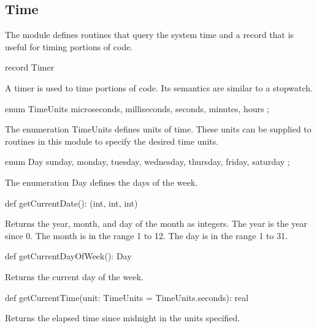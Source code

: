\subsection{Time}
\label{Time}

The module  defines routines that query the system time and
a record  that is useful for timing portions of code.

\vspace{1pc}

\begin{protohead}
record Timer
\end{protohead}
\begin{protobody}
A timer is used to time portions of code.  Its semantics are similar
to a stopwatch.
\end{protobody}

\begin{protohead}
enum TimeUnits { microseconds, milliseconds, seconds, minutes, hours };
\end{protohead}
\begin{protobody}
The enumeration TimeUnits defines units of time.  These units can be
supplied to routines in this module to specify the desired time units.
\end{protobody}

\begin{protohead}
enum Day { sunday, monday, tuesday, wednesday, thursday, friday, saturday };
\end{protohead}
\begin{protobody}
The enumeration Day defines the days of the week.
\end{protobody}


\begin{protohead}
def getCurrentDate(): (int, int, int)
\end{protohead}
\begin{protobody}
Returns the year, month, and day of the month as integers.  The year
is the year since 0.  The month is in the range 1 to 12.  The day is
in the range 1 to 31.
\end{protobody}

\begin{protohead}
def getCurrentDayOfWeek(): Day
\end{protohead}
\begin{protobody}
Returns the current day of the week.
\end{protobody}


\begin{protohead}
def getCurrentTime(unit: TimeUnits = TimeUnits.seconds): real
\end{protohead}
\begin{protobody}
Returns the elapsed time since midnight in the units specified.
\end{protobody}

